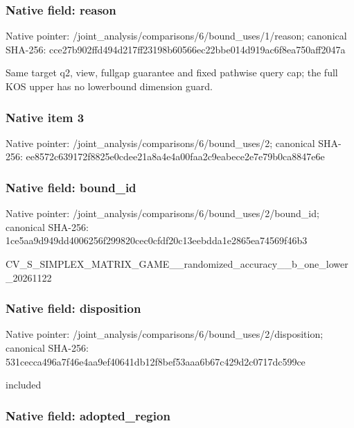 \documentclass[10pt,a4paper]{article}
\begin{document}
\subsubsection{Native field: reason}


Native pointer: /joint\_analysis/comparis\allowbreak{}ons/6/bound\_uses/1/reaso\allowbreak{}n; canonical SHA-256: cce27b902ffd494d217ff231\allowbreak{}98b60566ec22bbe014d919ac\allowbreak{}6f8ea750aff2047a


Same target q2, view, fullgap guarantee and fixed pathwise query cap; the full KOS upper has no lowerbound dimension guard.


\subsubsection{Native item 3}


Native pointer: /joint\_analysis/comparis\allowbreak{}ons/6/bound\_uses/2; canonical SHA-256: ee8572c639172f8825e0cdee\allowbreak{}21a8a4e4a00faa2c9eabece2\allowbreak{}e7e79b0ca8847e6e



\subsubsection{Native field: bound\_id}


Native pointer: /joint\_analysis/comparis\allowbreak{}ons/6/bound\_uses/2/bound\allowbreak{}\_id; canonical SHA-256: 1ce5aa9d949dd4006256f299\allowbreak{}820cec0cfdf20c13eebdda1e\allowbreak{}2865ea74569f46b3


CV\_S\_SIMPLEX\_MATRIX\_GAME\allowbreak{}\_\_randomized\_accuracy\_\_b\allowbreak{}\_one\_lower\_20261122


\subsubsection{Native field: disposition}


Native pointer: /joint\_analysis/comparis\allowbreak{}ons/6/bound\_uses/2/dispo\allowbreak{}sition; canonical SHA-256: 531cecca496a7f46e4aa9ef4\allowbreak{}0641db12f8bef53aaa6b67c4\allowbreak{}29d2c0717dc599ce


included


\subsubsection{Native field: adopted\_region}
\end{document}

